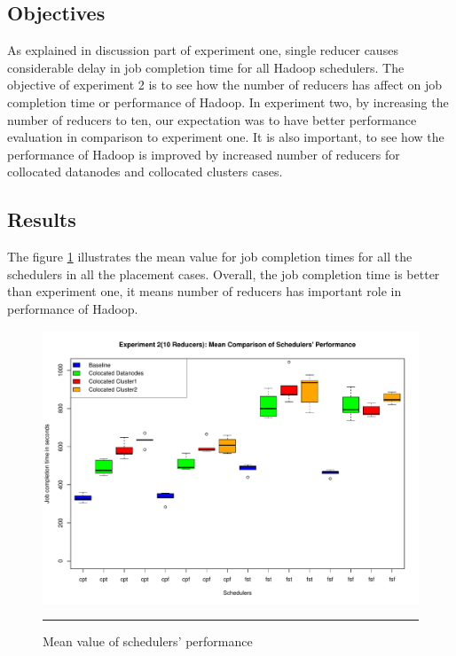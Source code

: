 \subsection{Objectives}

As explained in discussion part of experiment one, single reducer causes considerable delay in job completion time for all Hadoop schedulers. The objective of experiment 2 is to see how the number of reducers has affect on job completion time or performance of Hadoop. In experiment two, by increasing the number of reducers to ten, our expectation was to have better performance evaluation in comparison to experiment one. It is also important, to see how the performance of Hadoop is improved by increased number of reducers for collocated datanodes and collocated clusters cases. 



\subsection{Results}
The figure \ref{fig:exp_2_mean} illustrates the mean value for job completion times for all the schedulers in all the placement cases. Overall, the job completion time is better than experiment one, it means number of reducers has important role in performance of Hadoop.\\

\begin{figure}[htbp]
  \centering
    \includegraphics[width=\textwidth,height=\textheight,keepaspectratio]{./Figures/exp_2_mean.pdf}
    \rule{35em}{0.5pt}
  \caption{Mean value of schedulers' performance }
  \label{fig:exp_2_mean}
\end{figure} 

